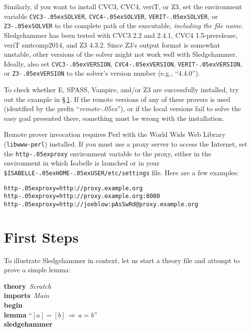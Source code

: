 \documentclass[a4paper,12pt]{article}
\let\oldS=\S
\def\S{\oldS\,}
\renewcommand\_{\hbox{\textunderscore\kern-.05ex}}
\begin{document}
\begin{sloppy}
\begin{enum}
Similarly, if you want to install CVC3, CVC4, veriT, or Z3, set the environment
variable \texttt{CVC3\_\allowbreak SOLVER}, \texttt{CVC4\_\allowbreak SOLVER},
\texttt{VERIT\_\allowbreak SOLVER}, or \texttt{Z3\_SOLVER} to the complete path
of the executable, \emph{including the file name}. Sledgehammer has been tested
with CVC3 2.2 and 2.4.1, CVC4 1.5-prerelease, veriT smtcomp2014, and Z3 4.3.2.
Since Z3's output format is somewhat unstable, other versions of the solver
might not work well with Sledgehammer. Ideally, also set
\texttt{CVC3\_VERSION}, \texttt{CVC4\_VERSION}, \texttt{VERIT\_VERSION}, or
\texttt{Z3\_VERSION} to the solver's version number (e.g., ``4.4.0'').
\end{enum}
\end{sloppy}

To check whether E, SPASS, Vampire, and/or Z3 are successfully installed, try
out the example in \S\ref{first-steps}. If the remote versions of any of these
provers is used (identified by the prefix ``\textit{remote\_\/}''), or if the
local versions fail to solve the easy goal presented there, something must be
wrong with the installation.

Remote prover invocation requires Perl with the World Wide Web Library
(\texttt{libwww-perl}) installed. If you must use a proxy server to access the
Internet, set the \texttt{http\_proxy} environment variable to the proxy, either
in the environment in which Isabelle is launched or in your
\texttt{\$ISABELLE\_HOME\_USER/etc/settings} file. Here are a few
examples:

\prew
\texttt{http\_proxy=http://proxy.example.org} \\
\texttt{http\_proxy=http://proxy.example.org:8080} \\
\texttt{http\_proxy=http://joeblow:pAsSwRd@proxy.example.org}
\postw

\section{First Steps}
\label{first-steps}

To illustrate Sledgehammer in context, let us start a theory file and
attempt to prove a simple lemma:

\prew
\textbf{theory}~\textit{Scratch} \\
\textbf{imports}~\textit{Main} \\
\textbf{begin} \\[2\smallskipamount]
%
\textbf{lemma} ``$[a] = [b] \,\Longrightarrow\, a = b$'' \\
\textbf{sledgehammer}
\postw
\end{document}
